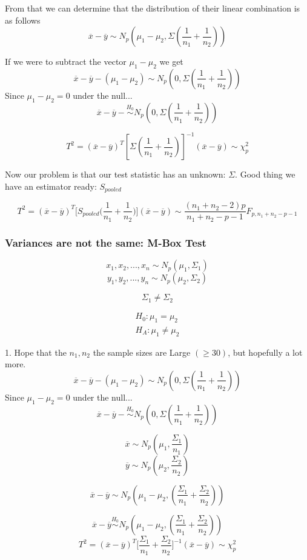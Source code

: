 From that we can determine that the distribution of their linear combination is as follows
\[\overline{x} -\overline{y} \sim N_p(\mu_1-\mu_2,\Sigma(\frac{1}{n_1}+\frac{1}{n_2}))\]

If we were to subtract the vector $\mu_1 -\mu_2$ we get
\[\overline{x} -\overline{y} - (\mu_1-\mu_2) \sim N_p(0,\Sigma(\frac{1}{n_1}+\frac{1}{n_2}))\]
Since $\mu_1-\mu_2 =0$ under the null...
\[\overline{x} -\overline{y} - \overset{H_0}{\sim} N_p(0,\Sigma(\frac{1}{n_1}+\frac{1}{n_2}))\]

\[T^2 = (\overline{x}-\overline{y})^T[\Sigma(\frac{1}{n_1} + \frac{1}{n_2})]^{-1}(\overline{x}-\overline{y}) \sim \chi_p^2\]

Now our problem is that our test statistic has an unknown: $\Sigma$. Good thing we have an estimator ready: $S_{pooled}$


\[T^2 = (\overline{x}-\overline{y})^T \Big[
S_{pooled} \bigg(\frac{1}{n_1} + \frac{1}{n_2}
\bigg) \Big]
(\overline{x}-\overline{y})\sim \frac{(n_1+n_2-2)p}{n_1+n_2-p-1}F_{p,n_1+n_2-p-1}\]

\subsubsection{Variances are not the same: M-Box Test}

\[x_1,x_2,...,x_n \sim N_p(\mu_1,\Sigma_1)\]
\[y_1,y_2,...,y_n \sim N_p(\mu_2,\Sigma_2)\]

\[\Sigma_1 \neq \Sigma_2\]

\begin{gather*}
    H_0 : \mu_1 = \mu_2\\
    H_A : \mu_1 \neq \mu_2
\end{gather*}

1. Hope that the $n_1, n_2$ the sample sizes are Large $(\geq 30)$, but hopefully a lot more.
\[\overline{x} -\overline{y} - (\mu_1-\mu_2) \sim N_p(0,\Sigma(\frac{1}{n_1}+\frac{1}{n_2}))\]
Since $\mu_1-\mu_2 =0$ under the null...
\[\overline{x} -\overline{y} - \overset{H_0}{\sim} N_p(0,\Sigma(\frac{1}{n_1}+\frac{1}{n_2}))\]

\[\overline{x} \sim N_p(\mu_1,\frac{\Sigma_1}{n_1})\]
\[\overline{y} \sim N_p(\mu_2,\frac{\Sigma_2}{n_2})\]

\[\overline{x} -\overline{y} \sim N_p(\mu_1-\mu_2,(\frac{\Sigma_1}{n_1}+\frac{\Sigma_2}{n_2}))\]

\[\overline{x} -\overline{y} \overset{H_0}{\sim} N_p(\mu_1-\mu_2,(\frac{\Sigma_1}{n_1}+\frac{\Sigma_2}{n_2}))\]
\[T^2 = (\overline{x}-\overline{y})^T
\Bigg[
\frac{\Sigma_1}{n_1}+\frac{\Sigma_2}{n_2}
\Bigg]^{-1}
(\overline{x}-\overline{y}) \sim \chi_p^2\]

